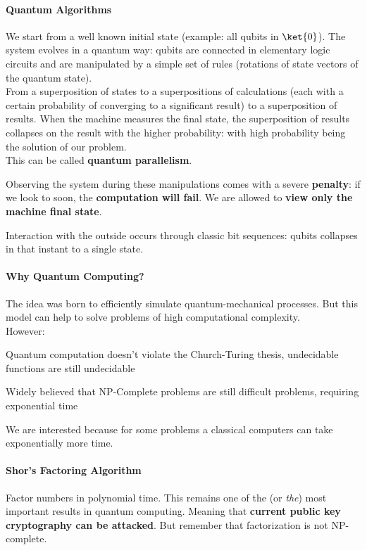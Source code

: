 \documentclass[10pt]{report}
\begin{document}
\paragraph{Quantum Algorithms} We start from a well known initial state (example: all qubits in $\ket{0}$). The system evolves in a quantum way: qubits are connected in elementary logic circuits and are manipulated by a simple set of rules (rotations of state vectors of the quantum state).\\
From a superposition of states to a superpositions of calculations (each with a certain probability of converging to a significant result) to a superposition of results. When the machine measures the final state, the superposition of results collapses on the result with the higher probability: with high probability being the solution of our problem.\\
This can be called \textbf{quantum parallelism}.\begin{list}{}{}
	\item Observing the system during these manipulations comes with a severe \textbf{penalty}: if we look to soon, the \textbf{computation will fail}. We are allowed to \textbf{view only the machine final state}.
	\item Interaction with the outside occurs through classic bit sequences: qubits collapses in that instant to a single state.
\end{list}
\paragraph{Why Quantum Computing?} The idea was born to efficiently simulate quantum-mechanical processes. But this model can help to solve problems of high computational complexity.\\
However:
\begin{list}{}{}
	\item Quantum computation doesn't violate the Church-Turing thesis, undecidable functions are still undecidable
	\item Widely believed that NP-Complete problems are still difficult problems, requiring exponential time
\end{list}
We are interested because for some problems a classical computers can take exponentially more time.
\paragraph{Shor's Factoring Algorithm} Factor numbers in polynomial time. This remains one of the (or \textit{the}) most important results in quantum computing. Meaning that \textbf{current public key cryptography can be attacked}. But remember that factorization is not NP-complete.
\end{document}
